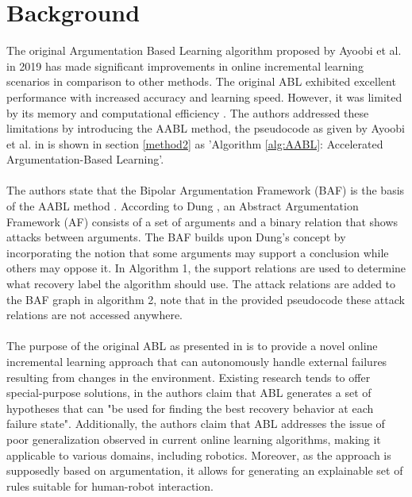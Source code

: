 \documentclass{article}
\begin{document}
\section{Background}
The original Argumentation Based Learning algorithm proposed by Ayoobi et al. in 2019 \cite{ayoobi2019handling} has made significant improvements in online incremental learning scenarios in comparison to other methods. The original ABL exhibited excellent performance with increased accuracy and learning speed. However, it was limited by its memory and computational efficiency \cite{ayoobi2021argue}. The authors addressed these limitations by introducing the AABL method, the pseudocode as given by Ayoobi et al. in \cite{ayoobi2021argue} is shown in section \ref{method2} as 'Algorithm \ref{alg:AABL}: Accelerated Argumentation-Based Learning'.
\\\\
The authors state that the Bipolar Argumentation Framework (BAF) \cite{amgoud2008bipolarity} is the basis of the AABL method \cite{ayoobi2021argue}. According to Dung \cite{dung1995acceptability}, an Abstract Argumentation Framework (AF) consists of a set of arguments and a binary relation that shows attacks between arguments. The BAF builds upon Dung's concept by incorporating the notion that some arguments may support a conclusion while others may oppose it. In Algorithm 1, the support relations are used to determine what recovery label the algorithm should use. The attack relations are added to the BAF graph in algorithm 2, note that in the provided pseudocode these attack relations are not accessed anywhere. 
\\\\
The purpose of the original ABL as presented in \cite{ayoobi2023fullthesis} is to provide a novel online incremental learning approach that can autonomously handle external failures resulting from changes in the environment. Existing research tends to offer special-purpose solutions, in \cite{ayoobi2023fullthesis} the authors claim that ABL generates a set of hypotheses that can "be used for finding the best recovery behavior at each failure state". Additionally, the authors claim that ABL addresses the issue of poor generalization observed in current online learning algorithms, making it applicable to various domains, including robotics. Moreover, as the approach is supposedly based on argumentation, it allows for generating an explainable set of rules suitable for human-robot interaction.
\end{document}
